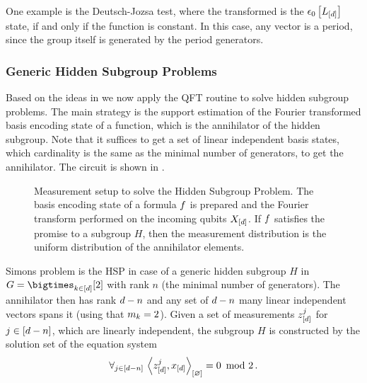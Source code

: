 One example is the Deutsch-Jozsa test, where the transformed is the $\epsilon_{0}\left[L_{[d]}\right]$ state, if and only if the function is constant.
In this case, any vector is a period, since the group itself is generated by the period generators.

\subsubsection{Generic Hidden Subgroup Problems}\label{sec:qcHSP}


Based on the ideas in  we now apply the QFT routine to solve hidden subgroup problems.
The main strategy is the support estimation of the Fourier transformed basis encoding state of a function, which is the annihilator of the hidden subgroup.
Note that it suffices to get a set of linear independent basis states, which cardinality is the same as the minimal number of generators, to get the annihilator.
The circuit is shown in .

\begin{figure}[t]
    
    \caption{
        Measurement setup to solve the Hidden Subgroup Problem.
        The basis encoding state of a formula $f$ is prepared and the Fourier transform performed on the incoming qubits $X_{[d]}$.
        If $f$ satisfies the promise to a subgroup $H$, then the measurement distribution is the uniform distribution of the annihilator elements.
    }\label{fig:hspSetup}
\end{figure}

\begin{example}
    Simons problem is the HSP in case of a generic hidden subgroup $H$ in $G=\atomstates$ with rank $n$ (the minimal number of generators).
    The annihilator then has rank $d-n$ and any set of $d-n$ many linear independent vectors spans it (using that $m_{k}=2$).
    Given a set of measurements $z^{j}_{[d]}$ for $j\in[d-n]$, which are linearly independent, the subgroup $H$ is constructed by the solution set of the equation system
    \begin{align*}
        \forall_{j\in[d-n]} \,\, {
            \left\langle z^{j}_{[d]},x_{[d]}\right\rangle_{\left[ \varnothing \right]} = 0 \,\,\,\mathrm{mod}\,\, 2
        } \, .
    \end{align*}
\end{example}


